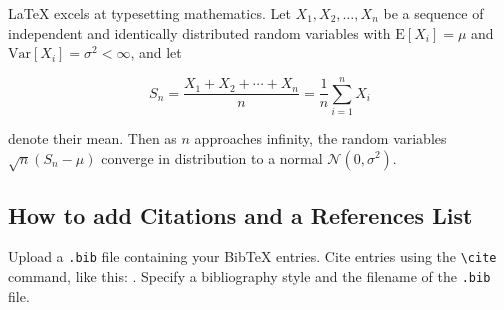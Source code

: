 \documentclass[]{article}
\begin{document}
\LaTeX{} excels at typesetting mathematics. Let $X_1, X_2, \ldots, X_n$ be a sequence of independent and identically distributed random variables with $\text{E}[X_i] = \mu$ and $\text{Var}[X_i] = \sigma^2 < \infty$, and let

$$S_n = \frac{X_1 + X_2 + \cdots + X_n}{n} = \frac{1}{n}\sum_{i=1}^{n} X_i$$

denote their mean. Then as $n$ approaches infinity, the random variables $\sqrt{n}(S_n - \mu)$ converge in distribution to a normal $\mathcal{N}(0, \sigma^2)$.

\subsection{How to add Citations and a References List}

Upload a \verb|.bib| file containing your BibTeX entries. Cite entries using the \verb|\cite| command, like this: \cite{greenwade93}. Specify a bibliography style and the filename of the \verb|.bib| file.


\end{document}
